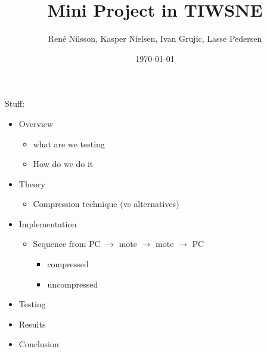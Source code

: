\documentclass[]{report}
\begin{document}
\title{Mini Project in TIWSNE}
\author{Ren\'e Nilsson, Kasper Nielsen, Ivan Grujic, Lasse Pedersen}
\date{\today}
\maketitle
{}



Stuff:

\begin{itemize}
\item Overview
  \begin{itemize}
  \item what are we testing
  \item How do we do it
  \end{itemize}
\item Theory
  \begin{itemize}
  \item Compression technique (vs alternatives) 
  \end{itemize}

\item Implementation
\begin{itemize}
\item Sequence from PC $\rightarrow$ mote $\rightarrow$ mote $\rightarrow$ PC
  \begin{itemize}
  \item compressed
  \item uncompressed
  \end{itemize}
\end{itemize}


\item Testing
\item Results
\item Conclusion
\end{itemize}
  
\end{document}
